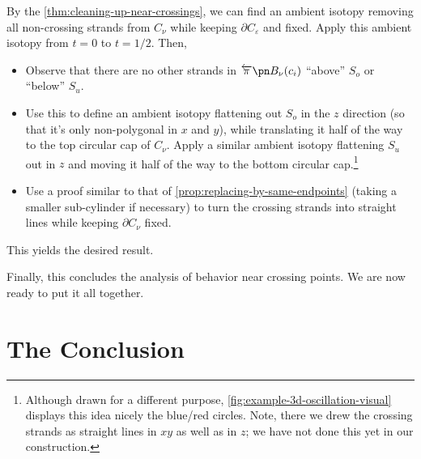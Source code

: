 \begin{sproof}[Sketch]
  By the \cref{thm:cleaning-up-near-crossings}, we can find an ambient
  isotopy removing all non-crossing strands from $C_\nu$ while keeping
  $\partial C_\varepsilon$ and 
  fixed. Apply this ambient isotopy from $t = 0$ to $t= 1/2$. Then,
  \begin{itemize}
    \item Observe that there are no other strands in $\fpre{\pi}{B_\nu(c_i)}$
      ``above'' $S_o$ or ``below'' $S_u$.
    \item Use this to define an ambient isotopy flattening out $S_o$
      in the $z$ direction (so that it's only non-polygonal in $x$ and
      $y$), while translating it half of the way to the top circular
      cap of $C_\nu$. Apply a similar ambient isotopy flattening $S_u$
      out in $z$ and moving it half of the way to the bottom circular
      cap.\footnote{Although drawn for a different purpose,
      \cref{fig:example-3d-oscillation-visual} displays this idea
      nicely the blue/red circles. Note, there we drew the crossing
      strands as straight lines in $xy$ as well as in $z$; we have not
      done this yet in our construction.}
    \item Use a proof similar to that of
      \cref{prop:replacing-by-same-endpoints} (taking a smaller
      sub-cylinder if necessary) to turn the crossing strands into
      straight lines while keeping $\partial C_\nu$ fixed.
  \end{itemize}
  This yields the desired result.
\end{sproof}
Finally, this concludes the analysis of behavior near crossing points.
We are now ready to put it all together.

\section{The Conclusion}

